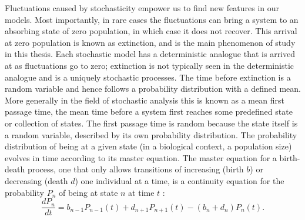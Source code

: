 Fluctuations caused by stochasticity empower us to find new features in our models. 
Most importantly, in rare cases the fluctuations can bring a system to an absorbing state of zero population, in which case it does not recover. 
This arrival at zero population is known as extinction, and is the main phenomenon of study in this thesis. 
Each stochastic model has a deterministic analogue that is arrived at as fluctuations go to zero; extinction is not typically seen in the deterministic analogue and is a uniquely stochastic processes. 
The time before extinction is a random variable and hence follows a probability distribution with a defined mean. 
More generally in the field of stochastic analysis this is known as a mean first passage time, the mean time before a system first reaches some predefined state or collection of states. 
The first passage time is random because the state itself is a random variable, described by its own probability distribution. 
The probability distribution of being at a given state (in a biological context, a population size) evolves in time according to its master equation. 
The master equation for a birth-death process, one that only allows transitions of increasing (birth $b$) or decreasing (death $d$) one individual at a time, is a continuity equation for the probability $P_n$ of being at state $n$ at time $t$ \cite{Nisbet1982,Gardiner2004a}:
\begin{equation}
\frac{dP_n}{dt} =  b_{n-1}P_{n-1}(t) + d_{n+1}P_{n+1}(t) - (b_n+d_n)P_n(t).
\label{master-eqn-intro}
\end{equation}


